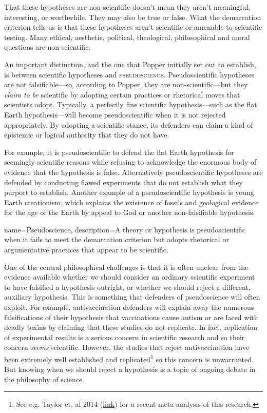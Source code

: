 That these hypotheses are non-scientific doesn't mean they aren't meaningful, interesting, or worthwhile. They may also be true or false. What the demarcation criterion tells us is that these hypotheses aren't scientific or amenable to scientific testing. Many ethical, aesthetic, political, theological, philosophical and moral questions are non-scientific.

An important distinction, and the one that Popper initially set out to establish, is between scientific hypotheses and \textsc{\gls{pseudoscience}}. Pseudoscientific hypotheses are not falsifiable---so, according to Popper, they are non-scientific---but they \emph{claim to be} scientific by adopting certain practices or rhetorical moves that scientists adopt. Typically, a perfectly fine scientific hypothesis---such as the flat Earth hypothesis---will become pseudoscientific when it is not rejected appropriately. By adopting a scientific stance, its defenders can claim a kind of epistemic or logical authority that they do not have.

For example, it is pseudoscientific to defend the flat Earth hypothesis for seemingly scientific reasons while refusing to acknowledge the enormous body of evidence that the hypothesis is false. Alternatively pseudoscientific hypotheses are defended by conducting flawed experiments that do not establish what they purport to establish. Another example of a pseudoscientific hypothesis is young Earth creationism, which explains the existence of fossils and geological evidence for the age of the Earth by appeal to God or another non-falsifiable hypothesis.

{
name=Pseudoscience,
description={A theory or hypothesis is pseudoscientific when it fails to meet the demarcation criterion but adopts rhetorical or argumentative practices that appear to be scientific.}
}

One of the central philosophical challenges is that it is often unclear from the evidence available whether we should consider an ordinary scientific experiment to have falsified a hypothesis outright, or whether we should reject a different, auxiliary hypothesis. This is something that defenders of pseudoscience will often exploit. For example, antivaccination defenders will explain away the numerous falsifications of their hypothesis that vaccinations cause autism or are laced with deadly toxins by claiming that these studies do not replicate. In fact, replication of experimental results is a serious concern in scientific research and so their concern \emph{seems} scientific. However, the studies that reject antivaccination have been extremely well established and replicated\footnote{See e.g. Taylor et. al 2014 (\href{https://www.ncbi.nlm.nih.gov/pubmed/24814559}{link}) for a recent meta-analysis of this research.} so this concern is unwarranted. But knowing when we should reject a hypothesis is a topic of ongoing debate in the philosophy of science.

